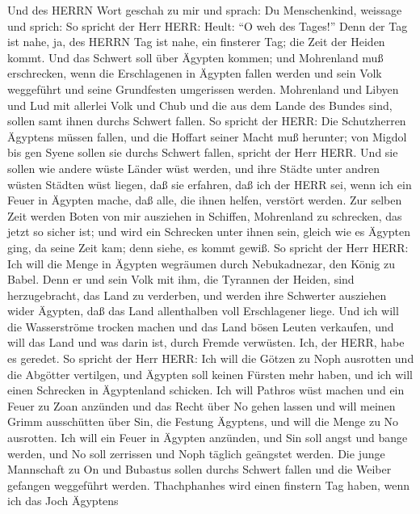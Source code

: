  Und des HERRN Wort geschah zu mir und sprach: 
Du Menschenkind, weissage und sprich: So spricht der Herr HERR: Heult:
``O weh des Tages!''  Denn der Tag ist nahe, ja, des HERRN
Tag ist nahe, ein finsterer Tag; die Zeit der Heiden kommt. 
Und das Schwert soll über Ägypten kommen; und Mohrenland muß
erschrecken, wenn die Erschlagenen in Ägypten fallen werden und sein
Volk weggeführt und seine Grundfesten umgerissen werden. 
Mohrenland und Libyen und Lud mit allerlei Volk und Chub und die aus dem
Lande des Bundes sind, sollen samt ihnen durchs Schwert fallen.
 So spricht der HERR: Die Schutzherren Ägyptens müssen
fallen, und die Hoffart seiner Macht muß herunter; von Migdol bis gen
Syene sollen sie durchs Schwert fallen, spricht der Herr HERR.
 Und sie sollen wie andere wüste Länder wüst werden, und
ihre Städte unter andren wüsten Städten wüst liegen,  daß
sie erfahren, daß ich der HERR sei, wenn ich ein Feuer in Ägypten mache,
daß alle, die ihnen helfen, verstört werden.  Zur selben
Zeit werden Boten von mir ausziehen in Schiffen, Mohrenland zu
schrecken, das jetzt so sicher ist; und wird ein Schrecken unter ihnen
sein, gleich wie es Ägypten ging, da seine Zeit kam; denn siehe, es
kommt gewiß.  So spricht der Herr HERR: Ich will die Menge
in Ägypten wegräumen durch Nebukadnezar, den König zu Babel.
 Denn er und sein Volk mit ihm, die Tyrannen der Heiden,
sind herzugebracht, das Land zu verderben, und werden ihre Schwerter
ausziehen wider Ägypten, daß das Land allenthalben voll Erschlagener
liege.  Und ich will die Wasserströme trocken machen und
das Land bösen Leuten verkaufen, und will das Land und was darin ist,
durch Fremde verwüsten. Ich, der HERR, habe es geredet.  So
spricht der Herr HERR: Ich will die Götzen zu Noph ausrotten und die
Abgötter vertilgen, und Ägypten soll keinen Fürsten mehr haben, und ich
will einen Schrecken in Ägyptenland schicken.  Ich will
Pathros wüst machen und ein Feuer zu Zoan anzünden und das Recht über No
gehen lassen  und will meinen Grimm ausschütten über Sin,
die Festung Ägyptens, und will die Menge zu No ausrotten. 
Ich will ein Feuer in Ägypten anzünden, und Sin soll angst und bange
werden, und No soll zerrissen und Noph täglich geängstet werden.
 Die junge Mannschaft zu On und Bubastus sollen durchs
Schwert fallen und die Weiber gefangen weggeführt werden. 
Thachphanhes wird einen finstern Tag haben, wenn ich das Joch Ägyptens
